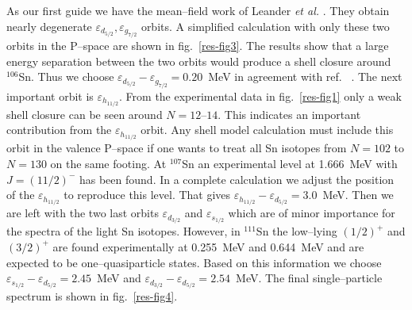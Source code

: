 As our first guide we have the mean--field work of
Leander {\em et al.} \cite{lean84}.
They obtain nearly degenerate
$\varepsilon_{d_{5/2}}, \varepsilon_{g_{7/2}}$ orbits.
A simplified calculation with only these two orbits in the P--space
are shown in fig.~\ref{res-fig3}. The results 
show that a large energy separation between the two orbits  would produce
a shell closure around $^{106}$Sn. Thus we choose $
\varepsilon_{d_{5/2}} - \varepsilon_{g_{7/2}} = 0.20$~MeV
in agreement with ref.~ \cite{grawe92}. The next important orbit
is $\varepsilon_{h_{11/2}}$. From the experimental data in
fig.~\ref{res-fig1} only a weak shell closure can be seen around
$N = 12\mbox{--}14$. 
This indicates an important contribution from
the $\varepsilon_{h_{11/2}}$ orbit.
Any shell model calculation must include this orbit in the valence 
P--space  if one wants to treat all Sn isotopes from $N = 102$ to 
$N= 130$ on the same footing.
At $^{107}$Sn an experimental level at 1.666~MeV with $J = (11/2)^{-}$
has been found. In a complete  calculation  we adjust the position
of the $\varepsilon_{h_{11/2}}$ to reproduce this level.
That gives
$\varepsilon_{h_{11/2}}-\varepsilon_{d_{5/2}} = 3.0$~MeV.
Then we are left with  the two last orbits
$\varepsilon_{d_{3/2}}$ and $\varepsilon_{s_{1/2}}$ which are of minor
importance for the spectra of the light Sn isotopes.
However, in $^{111}$Sn the low--lying  $(1/2)^{+}$ and $(3/2)^{+}$
are found experimentally at 0.255~MeV and 0.644~MeV
and are expected to be one--quasiparticle states\cite{san-94}.
Based on this information we choose
$\varepsilon_{s_{1/2}}-\varepsilon_{d_{5/2}} = 2.45$~MeV
and $\varepsilon_{d_{3/2}}-\varepsilon_{d_{5/2}} = 2.54$~MeV.
The final single--particle spectrum is shown in fig.~\ref{res-fig4}.


